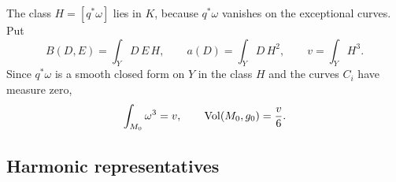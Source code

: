 The class $H=[q^*\omega]$ lies in $K$, because $q^*\omega$ vanishes on the
exceptional curves. Put
\begin{equation}\label{eq:intersection-forms}
 B(D,E)=\int_YD\,E\,H,\qquad a(D)=\int_YD\,H^2,\qquad v=\int_YH^3 .
\end{equation}
Since $q^*\omega$ is a smooth closed form on $Y$ in the class $H$ and
the curves $C_i$ have measure zero,
\begin{equation}\label{eq:volume}
 \int_{M_0}\omega^3=v,\qquad\operatorname{Vol}(M_0,g_0)=\frac v6 .
\end{equation}

\subsection{Harmonic representatives}

